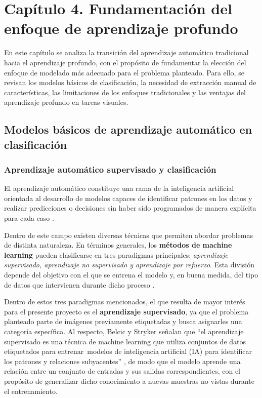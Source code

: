         \newpage
        
        \section*{Capítulo 4. Fundamentación del enfoque de aprendizaje profundo}
        \setcounter{section}{4}
        \setcounter{subsection}{0}
        
        En este capítulo se analiza la transición del aprendizaje automático tradicional hacia el aprendizaje profundo, con el propósito de fundamentar la elección del enfoque de modelado más adecuado para el problema planteado. Para ello, se revisan los modelos básicos de clasificación, la necesidad de extracción manual de características, las limitaciones de los enfoques tradicionales y las ventajas del aprendizaje profundo en tareas visuales.
        
        \subsection{Modelos básicos de aprendizaje automático en clasificación}
        
        \subsubsection{Aprendizaje automático supervisado y clasificación}
        
        El aprendizaje automático constituye una rama de la inteligencia artificial orientada al desarrollo de modelos capaces de identificar patrones en los datos y realizar predicciones o decisiones sin haber sido programados de manera explícita para cada caso \cite{bergmann2026machine_learning}. 
        
        Dentro de este campo existen diversas técnicas que permiten abordar problemas de distinta naturaleza. En términos generales, los \textbf{métodos de machine learning} pueden clasificarse en tres paradigmas principales: \textit{aprendizaje supervisado, aprendizaje no supervisado y aprendizaje por refuerzo}. Esta división depende del objetivo con el que se entrena el modelo y, en buena medida, del tipo de datos que intervienen durante dicho proceso \cite{bergmann2026machine_learning}.
        
        Dentro de estos tres paradigmas mencionados, el que resulta de mayor interés para el presente proyecto es el \textbf{aprendizaje supervisado}, ya que el problema planteado parte de imágenes previamente etiquetadas y busca asignarles una categoría específica. Al respecto, Belcic y Stryker señalan que “el aprendizaje supervisado es una técnica de machine learning que utiliza conjuntos de datos etiquetados para entrenar modelos de inteligencia artificial (IA) para identificar los patrones y relaciones subyacentes” \cite{belcic2026supervised_learning}, de modo que el modelo aprende una relación entre un conjunto de entradas y sus salidas correspondientes, con el propósito de generalizar dicho conocimiento a nuevas muestras no vistas durante el entrenamiento.
        
